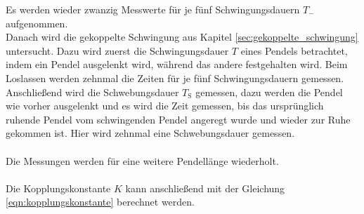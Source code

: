     Es werden wieder zwanzig Messwerte für je fünf Schwingungsdauern $T_-$ aufgenommen.\\
    Danach wird die gekoppelte Schwingung aus Kapitel \ref{sec:gekoppelte_schwingung} untersucht.
    Dazu wird zuerst die Schwingungsdauer $T$ eines Pendels betrachtet,
    indem ein Pendel ausgelenkt wird,
    während das andere festgehalten wird.
    Beim Loslassen werden zehnmal die Zeiten für je fünf Schwingungsdauern gemessen.
    Anschließend wird die Schwebungsdauer $T_\text{S}$ gemessen,
    dazu werden die Pendel wie vorher ausgelenkt und es wird die Zeit gemessen,
    bis das ursprünglich ruhende Pendel vom schwingenden Pendel angeregt wurde und wieder zur Ruhe gekommen ist.
    Hier wird zehnmal eine Schwebungsdauer gemessen.\\
    \\
    Die Messungen werden für eine weitere Pendellänge wiederholt.\\
    \\
    Die Kopplungskonstante $K$ kann anschließend mit der Gleichung \eqref{eqn:kopplungskonstante} berechnet werden.